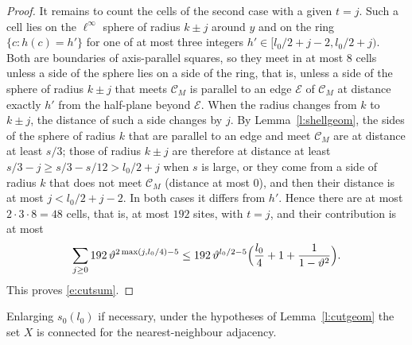 \begin{proof}
It remains to count the cells of the second case with a given $t = j$. Such a cell lies on the $\ell^\infty$ sphere of radius $k \pm j$ around $y$ and on the ring $\{c : h(c) = h'\}$ for one of at most three integers $h' \in [l_0/2 + j - 2, l_0/2 + j)$. Both are boundaries of axis-parallel squares, so they meet in at most $8$ cells unless a side of the sphere lies on a side of the ring, that is, unless a side of the sphere of radius $k \pm j$ that meets $\mathcal C_M$ is parallel to an edge $\mathcal E$ of $\mathcal C_M$ at distance exactly $h'$ from the half-plane beyond $\mathcal E$. When the radius changes from $k$ to $k \pm j$, the distance of such a side changes by $j$. By Lemma~\ref{l:shellgeom}, the sides of the sphere of radius $k$ that are parallel to an edge and meet $\mathcal C_M$ are at distance at least $s/3$; those of radius $k \pm j$ are therefore at distance at least $s/3 - j \ge s/3 - s/12 > l_0/2 + j$ when $s$ is large, or they come from a side of radius $k$ that does not meet $\mathcal C_M$ (distance at most $0$), and then their distance is at most $j < l_0/2 + j - 2$. In both cases it differs from $h'$. Hence there are at most $2 \cdot 3 \cdot 8 = 48$ cells, that is, at most $192$ sites, with $t = j$, and their contribution is at most
\begin{equation*}
\sum_{j \ge 0} 192 \, \vartheta^{2 \max(j, l_0/4) - 5} \le 192 \, \vartheta^{l_0/2 - 5} \Bigl( \frac{l_0}{4} + 1 + \frac{1}{1 - \vartheta^2} \Bigr).
\end{equation*}
This proves \eqref{e:cutsum}.
\end{proof}

\begin{lemma}\label{l:Xconn}
Enlarging $s_0(l_0)$ if necessary, under the hypotheses of Lemma~\ref{l:cutgeom} the set $X$ is connected for the nearest-neighbour adjacency.
\end{lemma}

